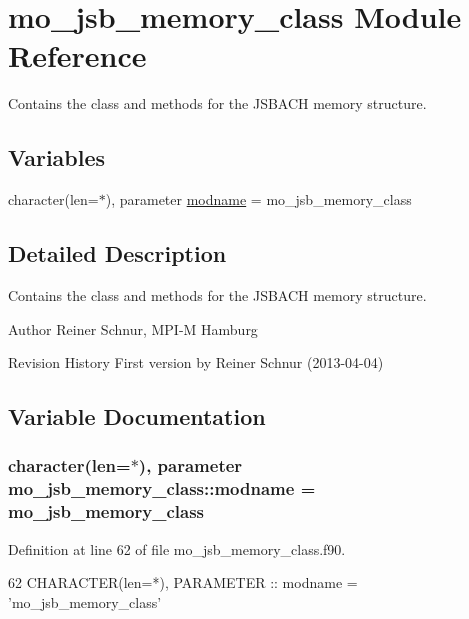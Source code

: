 \hypertarget{namespacemo__jsb__memory__class}{}\section{mo\+\_\+jsb\+\_\+memory\+\_\+class Module Reference}
\label{namespacemo__jsb__memory__class}


Contains the class and methods for the J\+S\+B\+A\+C\+H memory structure.  


\subsection*{Variables}
\begin{DoxyCompactItemize}
\item 
character(len=$\ast$), parameter \hyperlink{namespacemo__jsb__memory__class_a5f730dd2ee4741a6cca3a223fa21abaa}{modname} = \textquotesingle{}mo\+\_\+jsb\+\_\+memory\+\_\+class\textquotesingle{}
\end{DoxyCompactItemize}


\subsection{Detailed Description}
Contains the class and methods for the J\+S\+B\+A\+C\+H memory structure. 

\begin{DoxyAuthor}{Author}
Reiner Schnur, M\+P\+I-\/\+M Hamburg
\end{DoxyAuthor}
\begin{DoxyParagraph}{Revision History}
First version by Reiner Schnur (2013-\/04-\/04) 
\end{DoxyParagraph}


\subsection{Variable Documentation}
\hypertarget{namespacemo__jsb__memory__class_a5f730dd2ee4741a6cca3a223fa21abaa}{}
\subsubsection[{modname}]{\setlength{\rightskip}{0pt plus 5cm}character(len=$\ast$), parameter mo\+\_\+jsb\+\_\+memory\+\_\+class\+::modname = \textquotesingle{}mo\+\_\+jsb\+\_\+memory\+\_\+class\textquotesingle{}}\label{namespacemo__jsb__memory__class_a5f730dd2ee4741a6cca3a223fa21abaa}


Definition at line 62 of file mo\+\_\+jsb\+\_\+memory\+\_\+class.\+f90.


\begin{DoxyCode}
62   \textcolor{keywordtype}{CHARACTER(len=*)}, \textcolor{keywordtype}{PARAMETER} :: modname = \textcolor{stringliteral}{'mo\_jsb\_memory\_class'}
\end{DoxyCode}
